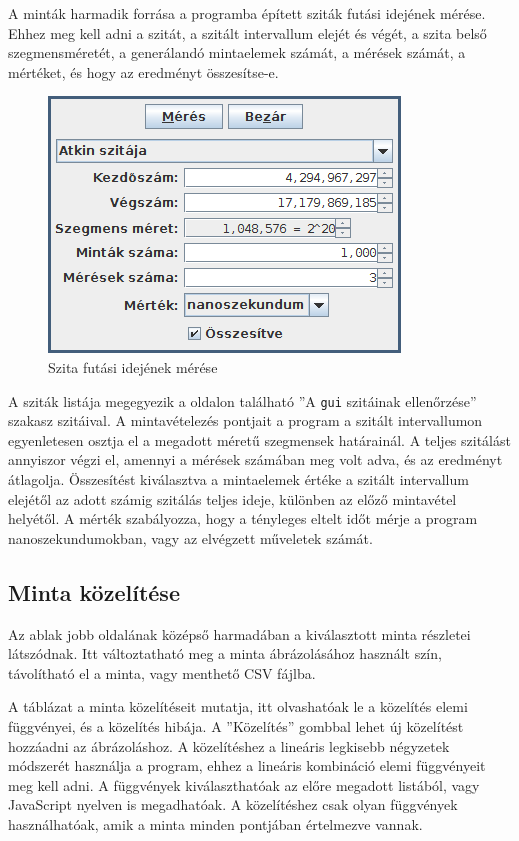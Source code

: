 A minták harmadik forrása a programba épített sziták futási idejének mérése.
Ehhez meg kell adni a szitát, a szitált intervallum elejét és végét, a szita belső szegmensméretét, a generálandó mintaelemek számát, a mérések számát, a mértéket, és hogy az eredményt összesítse-e.

\begin{figure}[h]
\caption{Szita futási idejének mérése}
\centering
\includegraphics[scale=1.0]{measure.png}
\end{figure}

A sziták listája megegyezik a \pageref{sec:szitak-ellenorzese} oldalon található ''A \texttt{gui} szitáinak ellenőrzése'' szakasz szitáival.
A mintavételezés pontjait a program a szitált intervallumon egyenletesen osztja el a megadott méretű szegmensek határainál.
A teljes szitálást annyiszor végzi el, amennyi a mérések számában meg volt adva, és az eredményt átlagolja.
Összesítést kiválasztva a mintaelemek értéke a szitált intervallum elejétől az adott számig szitálás teljes ideje, különben az előző mintavétel helyétől.
A mérték szabályozza, hogy a tényleges eltelt időt mérje a program nanoszekundumokban, vagy az elvégzett műveletek számát.

\subsection{Minta közelítése}

Az ablak jobb oldalának középső harmadában a kiválasztott minta részletei látszódnak.
Itt változtatható meg a minta ábrázolásához használt szín, távolítható el a minta, vagy menthető CSV fájlba.

A táblázat a minta közelítéseit mutatja, itt olvashatóak le a közelítés elemi függvényei, és a közelítés hibája.
A ''Közelítés'' gombbal lehet új közelítést hozzáadni az ábrázoláshoz.
A közelítéshez a lineáris legkisebb négyzetek módszerét használja a program, ehhez a lineáris kombináció elemi függvényeit meg kell adni.
A függvények kiválaszthatóak az előre megadott listából, vagy JavaScript nyelven is megadhatóak.
A közelítéshez csak olyan függvények használhatóak, amik a minta minden pontjában értelmezve vannak.

